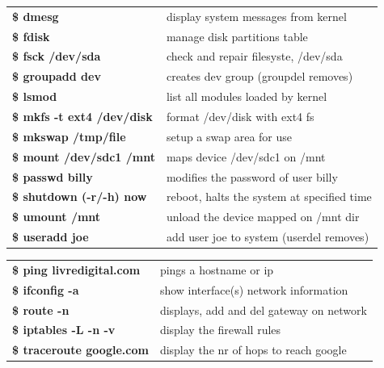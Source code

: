 \documentclass{beamer}
\begin{document}
\begin{frame}[t]
{\begin{minipage}[t]{.50\linewidth}
        \begin{minipage}[t]{0.475\textwidth}
            \begin{tabular}{l p{10cm} }
            \textbf{\$ dmesg} & display system messages from kernel\\
            \textbf{\$ fdisk} & manage disk partitions table\\
            \textbf{\$ fsck /dev/sda} & check and repair filesyste, /dev/sda\\
            \textbf{\$ groupadd dev} & creates dev group (groupdel removes)\\
            \textbf{\$ lsmod} & list all modules loaded by kernel\\
            \textbf{\$ mkfs -t ext4 /dev/disk} & format /dev/disk with ext4 fs\\
            \textbf{\$ mkswap /tmp/file} & setup a swap area for use\\
            \textbf{\$ mount /dev/sdc1 /mnt} & maps device /dev/sdc1 on /mnt\\
            \textbf{\$ passwd billy} & modifies the password of user billy\\
            \textbf{\$ shutdown (-r/-h) now} & reboot, halts the system at specified time\\
            \textbf{\$ umount /mnt} & unload the device mapped on /mnt dir\\
            \textbf{\$ useradd joe} & add user joe to system (userdel removes)\\
            \end{tabular}
        \end{minipage}
        \begin{minipage}[t]{0.010\textwidth}
            \hspace{\fill}
        \end{minipage}
        \begin{minipage}[t]{0.470\textwidth}
            \begin{tabular}{l p{11cm} }
            \textbf{\$ ping livredigital.com} & pings a hostname or ip\\
            \textbf{\$ ifconfig -a} & show interface(s) network information\\
            \textbf{\$ route -n} & displays, add and del gateway on network\\
            \textbf{\$ iptables -L -n -v} & display the firewall rules\\
            \textbf{\$ traceroute google.com} & display the nr of hops to reach google\\

\end{tabular}
\end{minipage}
\end{minipage}}
\end{frame}
\end{document}
